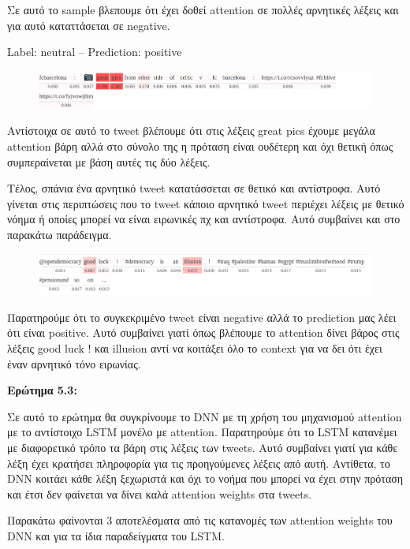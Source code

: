 \documentclass[12pt]{article}
\begin{document}
Σε αυτό το sample βλεπουμε ότι έχει δοθεί attention σε πολλές αρνητικές λέξεις και για αυτό καταττάσεται σε negative.

Label: neutral -- Prediction: positive

\begin{figure}[h]
	\centering
		\includegraphics[width=0.9\linewidth]{123}
	\label{fig:sin}
\end{figure}


Αντίστοιχα σε αυτό το tweet βλέπουμε ότι στις λέξεις great pics έχουμε μεγάλα attention βάρη αλλά στο σύνολο της η πρόταση είναι ουδέτερη και όχι θετική όπως συμπεραίνεται με βάση αυτές τις δύο λέξεις. 

Τέλος, σπάνια ένα αρνητικό tweet κατατάσσεται σε θετικό και αντίστροφα. Αυτό γίνεται στις περιπτώσεις που το tweet κάποιο αρνητικό tweet περιέχει λέξεις με θετικό νόημα ή οποίες μπορεί να είναι ειρωνικές πχ και αντίστροφα. Αυτό συμβαίνει και στο παρακάτω παράδειγμα.

\begin{figure}[h!]
	\centering
		\includegraphics[width=0.9\linewidth]{382}
	\label{fig:sin}
\end{figure}

\pagebreak
Παρατηρούμε ότι το συγκεκριμένο tweet είναι negative αλλά το prediction μας λέει ότι είναι positive. Αυτό συμβαίνει γιατί όπως βλέπουμε το attention δίνει βάρος στις λέξεις good luck ! και illusion αντί να κοιτάξει όλο το context για να δει ότι έχει έναν αρνητικό τόνο ειρωνίας. 

\textbf{Ερώτημα 5.3:}

Σε αυτό το ερώτημα θα συγκρίνουμε το DNN με τη χρήση του μηχανισμού attention με το αντίστοιχο LSTM μονέλο με attention. 
Παρατηρούμε ότι το LSTM κατανέμει με διαφορετικό τρόπο τα βάρη στις λέξεις των tweets. Αυτό συμβαίνει γιατί για κάθε λέξη έχει κρατήσει πληροφορία για τις προηγούμενες λέξεις από αυτή. Αντίθετα, το DNN κοιτάει κάθε λέξη ξεχωριστά και όχι το νοήμα που μπορεί να έχει στην πρόταση και έτσι δεν φαίνεται να δίνει καλά attention weights στα tweets. 

Παρακάτω φαίνονται 3 αποτελέσματα από τις κατανομές των attention weights του DNN και για τα ίδια παραδείγματα του LSTM.
\end{document}
